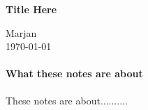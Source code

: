 \documentclass{report} %
\newcommand{\maketitletwo} %
	{\begin{center}
        \Large{\textbf{Title Here}} %
        \vspace{5pt}
        
        \normalsize{Marjan} %
        \\
        \normalsize{\today}

\end{center}}
\begin{document}
	\maketitletwo
	\paragraph{What these notes are about\\}
	These notes are about..........    
\end{document}
